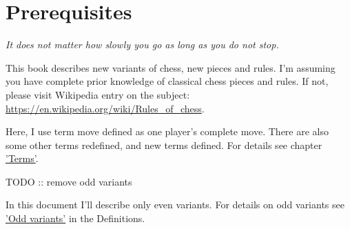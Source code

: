 

\chapter*{Prerequisites}

\begin{flushright}
\parbox{0.7\textwidth}{
\emph{It does not matter how slowly you go as long as you do not stop. \\
 } }
\end{flushright}

\noindent
This book describes new variants of chess, new pieces and rules. I'm assuming you have complete prior
knowledge of classical chess pieces and rules. If not, please visit Wikipedia entry on the subject: \\
\href{https://en.wikipedia.org/wiki/Rules\_of\_chess}{https://en.wikipedia.org/wiki/Rules\_of\_chess}.

Here, I use term move defined as one player's complete move. There are also some other terms redefined,
and new terms defined. For details see chapter \hyperref[ch:Terms]{'Terms'}.

\huge{TODO :: remove odd variants}
\normalsize{}

In this document I'll describe only even variants. For details on odd variants see
\hyperref[sec:Definitions/Odd variants]{'Odd variants'} in the Definitions.

\clearpage %
